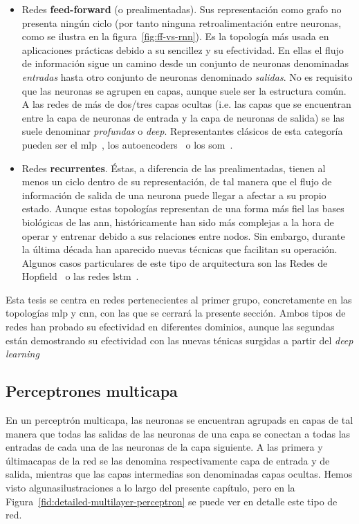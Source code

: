 \begin{itemize}
	\item Redes \textbf{feed-forward} (o prealimentadas). Sus representación como grafo no presenta ningún ciclo (por tanto ninguna retroalimentación entre neuronas, como se ilustra en la figura~\ref{fig:ff-vs-rnn}). Es la topología más usada en aplicaciones prácticas debido a su sencillez y su efectividad. En ellas el flujo de información sigue un camino desde un conjunto de neuronas denominadas \textit{entradas} hasta otro conjunto de neuronas denominado \textit{salidas}. No es requisito que las neuronas se agrupen en capas, aunque suele ser la estructura común. A las redes de más de dos/tres capas ocultas (i.e. las capas que se encuentran entre la capa de neuronas de entrada y la capa de neuronas de salida) se las suele denominar \textit{profundas} o \textit{deep}. Representantes clásicos de esta categoría pueden ser el \gls{mlp}~\cite{rumelhart1985learning}, los autoencoders~\cite{Hinton2006} o los \gls{som}~\cite{kohonen1998self}.
	\item Redes \textbf{recurrentes}. Éstas, a diferencia de las prealimentadas, tienen al menos un ciclo dentro de su representación, de tal manera que el flujo de información de salida de una neurona puede llegar a afectar a su propio estado. Aunque estas topologías representan de una forma más fiel las bases biológicas de las \gls{ann}, históricamente han sido más complejas a la hora de operar y entrenar debido a sus relaciones entre nodos. Sin embargo, durante la última década han aparecido nuevas técnicas que facilitan su operación. Algunos casos particulares de este tipo de arquitectura son las Redes de Hopfield~\cite{hopfield1982neural} o las redes \gls{lstm}~\cite{hochreiter1997long}.
\end{itemize}

Esta tesis se centra en redes pertenecientes al primer grupo, concretamente en las topologías \gls{mlp} y \gls{cnn}, con las que se cerrará la presente sección. Ambos tipos de redes han probado su efectividad en diferentes dominios, aunque las segundas están demostrando su efectividad con las nuevas ténicas surgidas a partir del \textit{deep learning}

\subsection{Perceptrones multicapa}

En un perceptrón multicapa, las neuronas se encuentran agrupads en capas de tal manera que todas las salidas de las neuronas de una capa se conectan a todas las entradas de cada una de las neuronas de la capa siguiente. A las primera y últimacapas de la red se las denomina respectivamente capa de entrada y de salida, mientras que las capas intermedias son denominadas capas ocultas. Hemos visto algunasilustraciones a lo largo del presente capítulo, pero en la Figura~\ref{fid:detailed-multilayer-perceptron} se puede ver en detalle este tipo de red.

